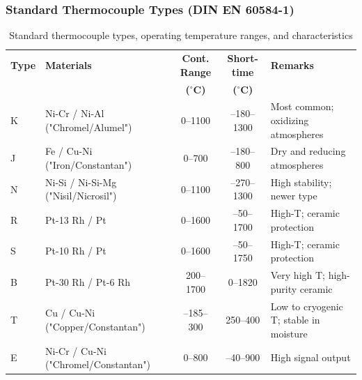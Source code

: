 \begin{frame}
	\frametitle{Standard Thermocouple Types (DIN EN 60584-1)}
    \small
    \begin{table}
        \centering
        \scriptsize
        \begin{tabular}{@{}l p{4.0cm} c c p{4.0cm}@{}}
            \toprule
            \textbf{Type} & \textbf{Materials} & \textbf{Cont. Range} & \textbf{Short-time}  & \textbf{Remarks} \\
                          &                    & \textbf{($^\circ$C)} & \textbf{($^\circ$C)} & \\
            \midrule
            K & Ni-Cr / Ni-Al ("Chromel/Alumel")         & 0--1100    & --180--1300 & Most common; oxidizing atmospheres \\
            J & Fe / Cu-Ni ("Iron/Constantan")           & 0--700     & --180--800  & Dry and reducing atmospheres \\
            N & Ni-Si / Ni-Si-Mg ("Nisil/Nicrosil")      & 0--1100    & --270--1300 & High stability; newer type \\
            R & Pt-13 Rh / Pt                            & 0--1600    & --50--1700  & High-T; ceramic protection \\
            S & Pt-10 Rh / Pt                            & 0--1600    & --50--1750  & High-T; ceramic protection \\
            B & Pt-30 Rh / Pt-6 Rh                       & 200--1700  & 0--1820     & Very high T; high-purity ceramic \\
            T & Cu / Cu-Ni ("Copper/Constantan")         & --185--300 & 250--400    & Low to cryogenic T; stable in moisture \\
            E & Ni-Cr / Cu-Ni ("Chromel/Constantan")     & 0--800     & --40--900   & High signal output \\
            \bottomrule
        \end{tabular}
        \caption{Standard thermocouple types, operating temperature ranges, and characteristics}
        \label{tab:thermocouple_types}
    \end{table}
\end{frame}

